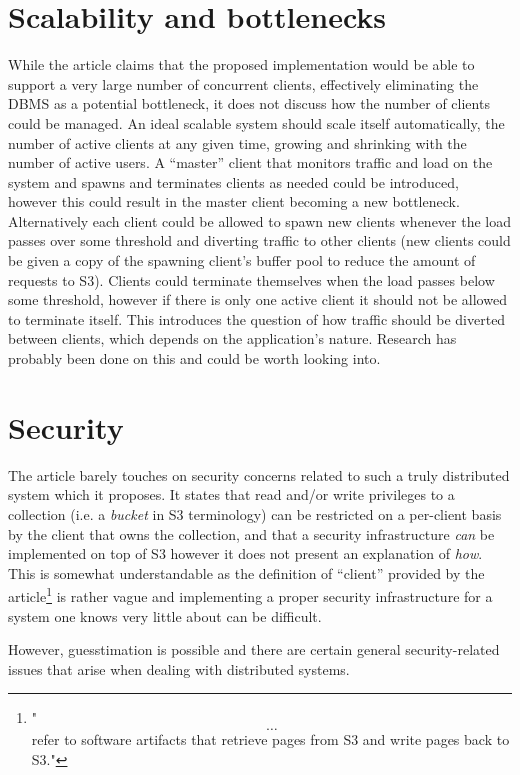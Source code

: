 \documentclass[11pt]{article}
\begin{document}
\section{Scalability and bottlenecks}
While the article claims that the proposed implementation would be able to support a very large number of concurrent clients, effectively eliminating the DBMS as a potential bottleneck, it does not discuss how the number of clients could be managed.
An ideal scalable system should scale itself automatically, the number of active clients at any given time, growing and shrinking with the number of active users.
A ``master'' client that monitors traffic and load on the system and spawns and terminates clients as needed could be introduced, however this could result in the master client becoming a new bottleneck.
Alternatively each client could be allowed to spawn new clients whenever the load passes over some threshold and diverting traffic to other clients (new clients could be given a copy of the spawning client's buffer pool to reduce the amount of requests to S3).
Clients could terminate themselves when the load passes below some threshold, however if there is only one active client it should not be allowed to terminate itself.
This introduces the question of how traffic should be diverted between clients, which depends on the application's nature.
Research has probably been done on this and could be worth looking into.


\section{Security}
The article barely touches on security concerns related to such a truly distributed system which it proposes.
It states that read and/or write privileges to a collection (i.e. a \textit{bucket} in S3 terminology) can be restricted on a per-client basis by the client that owns the collection, and that a security infrastructure \textit{can} be implemented on top of S3 however it does not present an explanation of \textit{how}.
This is somewhat understandable as the definition of ``client'' provided by the article\footnote{"\[\dots\] refer to software artifacts that retrieve pages from S3 and write pages back to S3."} is rather vague and implementing a proper security infrastructure for a system one knows very little about can be difficult.

However, guesstimation is possible and there are certain general security-related issues that arise when dealing with distributed systems.
\end{document}
